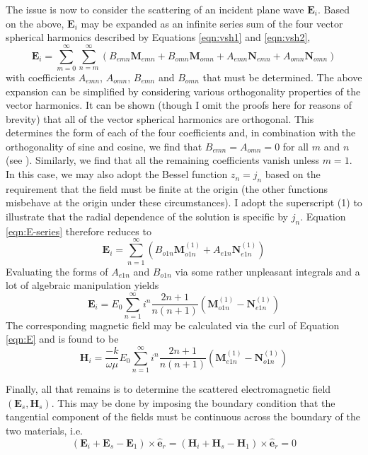 {The issue is now to consider the scattering of an incident plane wave $\mathbf{E}_i$.  Based on the above, $\mathbf{E}_i$ may be expanded as an infinite series sum of the four vector spherical harmonics described by Equations \ref{eqn:vsh1} and \ref{eqn:vsh2},
\begin{equation}
\label{eqn:E-series}
\mathbf{E}_i = \sum _{m=0} ^{\infty}  \sum _{n=m} ^{\infty} (B_{emn}\mathbf{M}_{emn} + B_{omn}\mathbf{M}_{omn} + A_{emn}\mathbf{N}_{emn} + A_{omn}\mathbf{N}_{omn})
\end{equation}
\noindent with coefficients $A_{emn}$, $A_{omn}$, $B_{emn}$ and $B_{omn}$ that must be determined.  The above expansion can be simplified by considering various orthogonality properties of the vector harmonics.  It can be shown (though I omit the proofs here for reasons of brevity) that all of the vector spherical harmonics are orthogonal.  This determines the form of each of the four coefficients and, in combination with the orthogonality of sine and cosine, we find that $B_{emn}=A_{omn}=0$ for all $m$ and $n$ (see \citet{Bohren1983}).  Similarly, we find that all the remaining coefficients vanish unless $m=1$.  In this case, we may also adopt the Bessel function $z_n=j_n$ based on the requirement that the field must be finite at the origin (the other functions misbehave at the origin under these circumstances).  I adopt the superscript (1) to illustrate that the radial dependence of the solution is specific by $j_n$.  Equation \ref{eqn:E-series} therefore reduces to
\begin{equation}
\mathbf{E}_i = \sum _{n=1} ^{\infty} (B_{o1n}\mathbf{M}_{o1n}^{(1)} + A_{e1n}\mathbf{N}_{e1n}^{(1)})
\end{equation}
Evaluating the forms of $A_{e1n}$ and $B_{o1n}$ via some rather unpleasant integrals and a lot of algebraic manipulation yields
\begin{equation}
\label{eqn:E}
\mathbf{E}_i = E_0 \sum _{n=1} ^{\infty} i^n \frac{2n+1}{n(n+1)}(\mathbf{M}_{o1n}^{(1)} - \mathbf{N}_{e1n}^{(1)})
\end{equation}
The corresponding magnetic field may be calculated via the curl of Equation \ref{eqn:E} and is found to be
\begin{equation}
\label{eqn:H}
\mathbf{H}_i = \frac{-k}{\omega\mu}E_0 \sum _{n=1} ^{\infty} i^n \frac{2n+1}{n(n+1)}(\mathbf{M}_{e1n}^{(1)} - \mathbf{N}_{o1n}^{(1)})
\end{equation}

\noindent Finally, all that remains is to determine the scattered electromagnetic field $(\mathbf{E}_s,\mathbf{H}_s)$.  This may be done by imposing the boundary condition that the tangential component of the fields must be continuous across the boundary of the two materials, i.e.
\begin{equation}
(\mathbf{E}_i+\mathbf{E}_s-\mathbf{E}_1)\times \mathbf{\hat{e}}_r=(\mathbf{H}_i+\mathbf{H}_s-\mathbf{H}_1)\times \mathbf{\hat{e}}_r=0
\end{equation}
 
}
